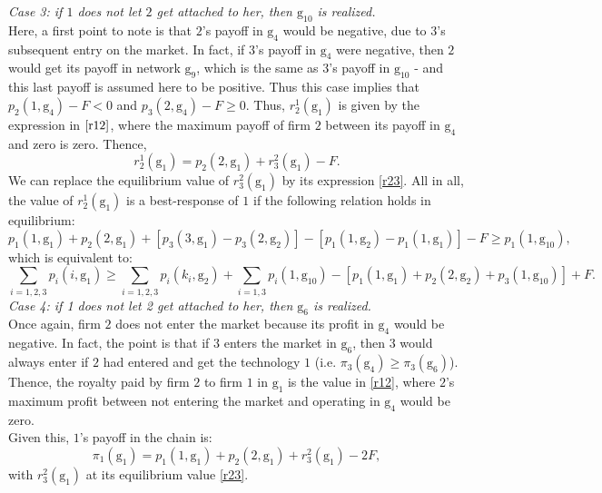 \documentclass{article}
\begin{document}
\textit{Case 3: if $1$ does not let $2$ get attached to her, then $\text{g}_{10}$ is realized.}\\
Here, a first point to note is that $2$'s payoff in $\text{g}_4$ would be negative, due to $3$'s subsequent entry on the market. In fact, if $3$'s payoff in $\text{g}_4$ were negative, then $2$ would get its payoff in network $\text{g}_9$, which is the same as $3$'s payoff in $\text{g}_{10}$ - and this last payoff is assumed here to be positive. Thus this case implies that $p_2(1,\text{g}_4)-F< 0$ and $p_3(2,\text{g}_4)-F\geq 0$. Thus, $r^1_2(\text{g}_1)$ is given by the expression in $\eqref{r12}$, where the maximum payoff of firm $2$ between its payoff in $\text{g}_4$ and zero is zero. Thence,  
\begin{equation*}
    r^1_2(\text{g}_1)=p_2(2,\text{g}_1)+r^2_3(\text{g}_1)-F. 
\end{equation*}
We can replace the equilibrium value of $r^2_3(\text{g}_1)$ by its expression \eqref{r23}. All in all, the value of $r^1_2(\text{g}_1)$ is a best-response of $1$ if the following relation holds in equilibrium: 
\begin{equation*}
    p_1(1,\text{g}_1)+p_2(2,\text{g}_1)+[ p_3(3,\text{g}_1)-p_3(2,\text{g}_2)]-[p_1(1,\text{g}_2)-p_1(1,\text{g}_1)]-F  \geq p_1(1,\text{g}_{10}),
\end{equation*}
which is equivalent to: 
\begin{equation}
    \sum_{i=1,2,3}p_i(i,\text{g}_1)\geq \sum_{i=1,2,3}p_i(k_i,\text{g}_2)+\sum_{i=1,3}p_i(1,\text{g}_{10})-[p_1(1,\text{g}_1)+p_2(2,\text{g}_2)+p_3(1,\text{g}_{10})]+F.
\end{equation}
\textit{Case 4: if 1 does not let 2 get attached to her, then $\text{g}_6$ is realized.}\\
Once again, firm $2$ does not enter the market because its profit in $\text{g}_4$ would be negative. In fact, the point is that if $3$ enters the market in $\text{g}_6$, then $3$ would always enter if $2$ had entered and get the technology $1$ (i.e. $\pi_3(\text{g}_4)\geq \pi_3(\text{g}_6)$). Thence, the royalty paid by firm $2$ to firm $1$ in $\text{g}_1$ is the value in \eqref{r12}, where $2$'s maximum profit between not entering the market and operating in $\text{g}_4$ would be zero.\\
Given this, $1$'s payoff in the chain is: 
\begin{equation*}
    \pi_1(\text{g}_1)=p_1(1,\text{g}_1)+p_2(2,\text{g}_1)+r^2_3(\text{g}_1)-2F,
\end{equation*}
with $r^2_3(\text{g}_1)$ at its equilibrium value \eqref{r23}. \\
\end{document}
